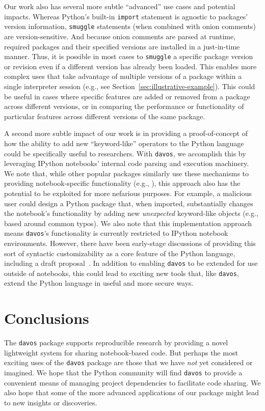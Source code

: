 \documentclass[preprint,12pt,a4paper]{elsarticle}
\begin{document}
Our work also has several more subtle ``advanced'' use cases and
potential impacts. Whereas Python's built-in \texttt{import} statement
is agnostic to packages' version information, \texttt{smuggle}
statements (when combined with onion comments) are version-sensitive.
And because onion comments are parsed at runtime, required packages
and their specified versions are installed in a just-in-time
manner. Thus, it is possible in most cases to \texttt{smuggle} a
specific package version or revision even if a different version has
already been loaded. This enables more complex uses that take
advantage of multiple versions of a package within a single
interpreter session (e.g., see
Section~\ref{sec:illustrative-example}). This could be useful in cases
where specific features are added or removed from a package across
different versions, or in comparing the performance or functionality
of particular features across different versions of the same package.

A second more subtle impact of our work is in providing a
proof-of-concept of how the ability to add new ``keyword-like''
operators to the Python language could be specifically useful to
researchers. With \texttt{davos}, we accomplish this by leveraging
IPython notebooks' internal code parsing and execution machinery. We
note that, while other popular packages similarly use these mechanisms
to providing notebook-specific functionality (e.g.,
\cite{Hunt07,HeusEtal18a}), this approach also has the potential to be
exploited for more nefarious purposes. For example, a malicious user
could design a Python package that, when imported, substantially
changes the notebook's functionality by adding new \textit{unexpected}
keyword-like objects (e.g., based around common typos). We also note
that this implementation approach means \texttt{davos}'s functionality
is currently restricted to IPython notebook environments. However,
there have been early-stage discussions of providing this sort of
syntactic customizability as a core feature of the Python language,
including a draft proposal~\cite{Shan20}. In addition to enabling
\texttt{davos} to be extended for use outside of notebooks, this could
lead to exciting new tools that, like \texttt{davos}, extend the
Python language in useful and more secure ways.


\section{Conclusions}

The \texttt{davos} package supports reproducible research by providing
a novel lightweight system for sharing notebook-based code. But
perhaps the most exciting uses of the \texttt{davos} package are those
that we have \textit{not} yet considered or imagined. We hope that the
Python community will find \texttt{davos} to provide a convenient
means of managing project dependencies to facilitate code sharing. We
also hope that some of the more advanced applications of our package
might lead to new insights or discoveries.
\end{document}
